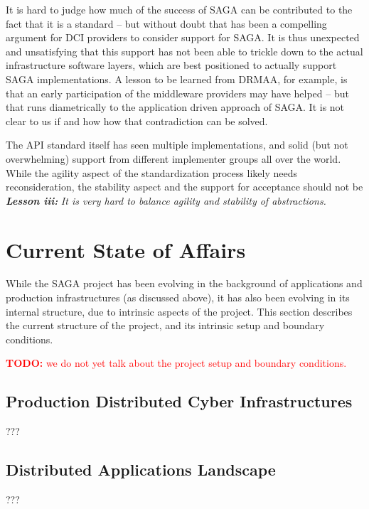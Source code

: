 \documentclass{article}
\newcommand{\I}[1]{\textit{#1}}
\newcommand{\B}[1]{\textbf{#1}}
\newcommand{\BI}[1]{\textbf{\textit{#1}}}
\newcommand{\todo}[1]{{\textcolor{red}{\B{TODO:} #1 }}}
\newcommand{\todo}[1]{}
\begin{document}
  It is hard to judge how much of the success of SAGA can be
  contributed to the fact that it is a standard -- but without doubt
  that has been a compelling argument for DCI providers to consider
  support for SAGA.  It is thus unexpected and unsatisfying that this
  support has not been able to trickle down to the actual
  infrastructure software layers, which are best positioned to
  actually support SAGA implementations.  A lesson to be learned from
  DRMAA, for example, is that an early participation of the middleware
  providers may have helped -- but that runs diametrically to the
  application driven approach of SAGA.  It is not clear to us if and
  how how that contradiction can be solved.

  The API standard itself has seen multiple implementations, and solid
  (but not overwhelming) support from different implementer groups all
  over the world.  While the agility aspect of the standardization
  process likely needs reconsideration, the stability aspect and the
  support for acceptance should not be\\
  \BI{Lesson iii:} \I{It is very hard to balance agility and stability
  of abstractions.}




\section{Current State of Affairs}
\label{sec:state}

 While the SAGA project has been evolving in the background of
 applications and production infrastructures (as discussed above), it
 has also been evolving in its internal structure, due to intrinsic
 aspects of the project.  This section describes the current structure
 of the project, and its intrinsic setup and boundary conditions.

 \todo{we do not yet talk about the project setup and boundary
 conditions.}

 \subsection{Production Distributed Cyber Infrastructures}
  
  ???

 \subsection{Distributed Applications Landscape}
 
  ???
\end{document}
